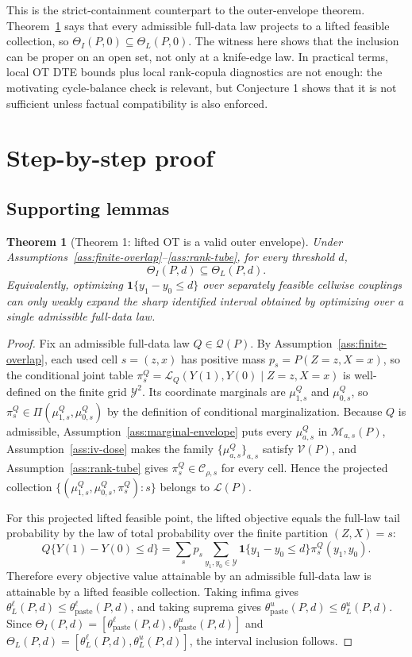 \documentclass[11pt]{article}
\newcommand{\one}{\mathbf{1}}
\theoremstyle{definition}
\theoremstyle{plain}
\newtheorem{theorem}{Theorem}
\theoremstyle{remark}
\begin{document}
This is the strict-containment counterpart to the outer-envelope theorem.  Theorem~\ref{thm:cellwise-outer} says that every admissible full-data law projects to a lifted feasible collection, so \(\Theta_I(P,0)\subseteq\Theta_L(P,0)\).  The witness here shows that the inclusion can be proper on an open set, not only at a knife-edge law.  In practical terms, local OT DTE bounds plus local rank-copula diagnostics are not enough: the motivating cycle-balance check is relevant, but Conjecture 1 shows that it is not sufficient unless factual compatibility is also enforced.

\section{Step-by-step proof}
\subsection*{Supporting lemmas}
\begin{theorem}[Theorem 1: lifted OT is a valid outer envelope]\label{thm:cellwise-outer}
Under Assumptions~\ref{ass:finite-overlap}--\ref{ass:rank-tube}, for every threshold \(d\),
\[
\Theta_I(P,d)\subseteq \Theta_L(P,d).
\]
Equivalently, optimizing \(\one\{y_1-y_0\le d\}\) over separately feasible cellwise couplings can only weakly expand the sharp identified interval obtained by optimizing over a single admissible full-data law.
\end{theorem}
\begin{proof}
Fix an admissible full-data law \(Q\in\mathcal Q(P)\).  By Assumption~\ref{ass:finite-overlap}, each used cell \(s=(z,x)\) has positive mass \(p_s=P(Z=z,X=x)\), so the conditional joint table \(\pi_s^Q=\mathcal L_Q(Y(1),Y(0)\mid Z=z,X=x)\) is well-defined on the finite grid \(\mathcal Y^2\).  Its coordinate marginals are \(\mu_{1,s}^Q\) and \(\mu_{0,s}^Q\), so \(\pi_s^Q\in\Pi(\mu_{1,s}^Q,\mu_{0,s}^Q)\) by the definition of conditional marginalization.  Because \(Q\) is admissible, Assumption~\ref{ass:marginal-envelope} puts every \(\mu_{a,s}^Q\) in \(\mathcal M_{a,s}(P)\), Assumption~\ref{ass:iv-dose} makes the family \(\{\mu_{a,s}^Q\}_{a,s}\) satisfy \(\mathcal V(P)\), and Assumption~\ref{ass:rank-tube} gives \(\pi_s^Q\in\mathcal C_{\rho,s}\) for every cell.  Hence the projected collection \(\{(\mu_{1,s}^Q,\mu_{0,s}^Q,\pi_s^Q):s\}\) belongs to \(\mathcal L(P)\).

For this projected lifted feasible point, the lifted objective equals the full-law tail probability by the law of total probability over the finite partition \((Z,X)=s\):
\[
Q\{Y(1)-Y(0)\le d\}=\sum_s p_s\sum_{y_1,y_0\in\mathcal Y}\one\{y_1-y_0\le d\}\pi_s^Q(y_1,y_0).
\]
Therefore every objective value attainable by an admissible full-data law is attainable by a lifted feasible collection.  Taking infima gives \(\theta_L^\ell(P,d)\le \theta_{\mathrm{paste}}^\ell(P,d)\), and taking suprema gives \(\theta_{\mathrm{paste}}^u(P,d)\le \theta_L^u(P,d)\).  Since \(\Theta_I(P,d)=[\theta_{\mathrm{paste}}^\ell(P,d),\theta_{\mathrm{paste}}^u(P,d)]\) and \(\Theta_L(P,d)=[\theta_L^\ell(P,d),\theta_L^u(P,d)]\), the interval inclusion follows.
\end{proof}
\end{document}

